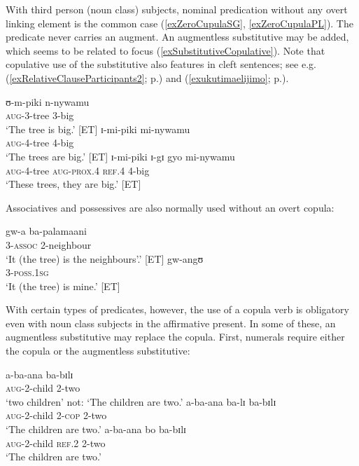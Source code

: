 With third person (noun class) subjects, nominal predication without any overt linking element is the common case (\ref{exZeroCupulaSG}, \ref{exZeroCupulaPL}). The predicate never carries an augment. An augmentless substitutive may be added, which seems to be related to focus (\ref{exSubstitutiveCopulative}). Note that copulative use of the substitutive also features in cleft sentences; see e.g. (\ref{exRelativeClauseParticipants2}; p.\nobreakspace\pageref{exRelativeClauseParticipants2}) and (\ref{exukutimaelijimo}; p.\nobreakspace\pageref{exukutimaelijimo}). 

\begin{exe}
\ex \begin{xlist}
\ex \label{exZeroCupulaSG}\gll ʊ-m-piki n-nywamu\\
\textsc{aug}-3-tree 3-big\\
\glt `The tree is big.' [ET]
\ex \label{exZeroCupulaPL}\gll ɪ-mi-piki mi-nywamu\\
\textsc{aug}-4-tree 4-big\\
\glt `The trees are big.' [ET]
\ex \label{exSubstitutiveCopulative} \gll ɪ-mi-piki ɪ-gɪ gyo mi-nywamu\\
\textsc{aug}-4-tree \textsc{aug}-\textsc{prox.4} \textsc{ref.4} 4-big\\
\glt \lq These trees, they are big.' [ET]
\end{xlist}
\end{exe}
Associatives and possessives are also normally used without an overt copula:
\largerpage[2]
\begin{exe}
\ex \gll gw-a ba-palamaani\\
3-\textsc{assoc} 2-neighbour\\
\glt \lq It (the tree) is the neighbours'.' [ET]
\ex \gll gw-angʊ\\
3-\textsc{poss.1sg}\\
\glt \lq It (the tree) is mine.' [ET]
\end{exe}

With certain types of predicates, however, the use of a copula verb is obligatory even with noun class subjects in the affirmative present. In some of these, an augmentless substitutive may replace the copula. First, numerals require either the copula or the augmentless substitutive:
\begin{exe}
\ex
\begin{xlist}
\ex \gll a-ba-ana ba-bɪlɪ\\
\textsc{aug}-2-child 2-two\\
\glt \lq two children' not: \lq The children are two.'
\ex \gll a-ba-ana ba-lɪ ba-bɪlɪ\\
\textsc{aug}-2-child 2-\textsc{cop} 2-two\\
\glt \lq The children are two.'
\ex \gll a-ba-ana bo ba-bɪlɪ\\
\textsc{aug}-2-child \textsc{ref.2} 2-two\\
\glt \lq The children are two.'
\end{xlist}
\end{exe}

